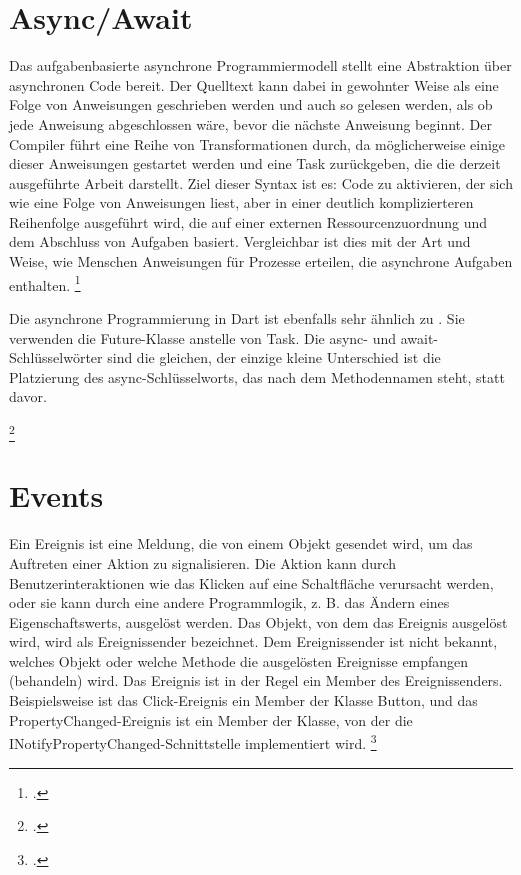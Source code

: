 \section{Async/Await}
Das aufgabenbasierte asynchrone Programmiermodell stellt eine Abstraktion über asynchronen Code bereit. Der Quelltext kann dabei in gewohnter Weise als eine Folge von Anweisungen geschrieben werden und auch so gelesen werden, als ob jede Anweisung abgeschlossen wäre, bevor die nächste Anweisung beginnt. Der Compiler führt eine Reihe von Transformationen durch, da möglicherweise einige dieser Anweisungen gestartet werden und eine Task zurückgeben, die die derzeit ausgeführte Arbeit darstellt.
Ziel dieser Syntax ist es: Code zu aktivieren, der sich wie eine Folge von Anweisungen liest, aber in einer deutlich komplizierteren Reihenfolge ausgeführt wird, die auf einer externen Ressourcenzuordnung und dem Abschluss von Aufgaben basiert. Vergleichbar ist dies mit der Art und Weise, wie Menschen Anweisungen für Prozesse erteilen, die asynchrone Aufgaben enthalten.  \footcite[Vgl. MICROSFT Async await][Abgerufen am \today]{GoogleFlutterSharedPreferences2020} 

Die asynchrone Programmierung in Dart ist ebenfalls sehr ähnlich zu \Csharp. Sie verwenden die Future-Klasse anstelle von Task. Die async- und await-Schlüsselwörter sind die gleichen, der einzige kleine Unterschied ist die Platzierung des async-Schlüsselworts, das nach dem Methodennamen steht, statt davor.

\begin{minipage}{\linewidth}

\end{minipage}
\footcitetext[In Anlehnung an ][Abgerufen am \today]{Pedley2019}


\section{Events}
Ein Ereignis ist eine Meldung, die von einem Objekt gesendet wird, um das Auftreten einer Aktion zu signalisieren. Die Aktion kann durch Benutzerinteraktionen wie das Klicken auf eine Schaltfläche verursacht werden, oder sie kann durch eine andere Programmlogik, z. B. das Ändern eines Eigenschaftswerts, ausgelöst werden. Das Objekt, von dem das Ereignis ausgelöst wird, wird als Ereignissender bezeichnet. Dem Ereignissender ist nicht bekannt, welches Objekt oder welche Methode die ausgelösten Ereignisse empfangen (behandeln) wird. Das Ereignis ist in der Regel ein Member des Ereignissenders. Beispielsweise ist das Click-Ereignis ein Member der Klasse Button, und das PropertyChanged-Ereignis ist ein Member der Klasse, von der die INotifyPropertyChanged-Schnittstelle implementiert wird. \footcite[Vgl. MICROSFT Events][Abgerufen am \today]{GoogleFlutterSharedPreferences2020} 

